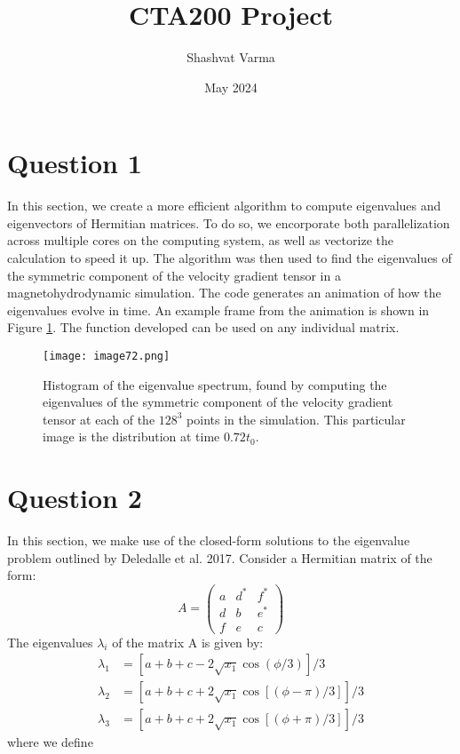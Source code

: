\documentclass{article}
\title{CTA200 Project}
\author{Shashvat Varma}
\date{May 2024}
\begin{document}
\maketitle

\section*{Question 1}
In this section, we create a more efficient algorithm to compute eigenvalues and eigenvectors of Hermitian matrices. To do so, we encorporate both parallelization across multiple cores on the computing system, as well as vectorize the calculation to speed it up. The algorithm was then used to find the eigenvalues of the symmetric component of the velocity gradient tensor in a magnetohydrodynamic simulation. The code generates an animation of how the eigenvalues evolve in time. An example frame from the animation is shown in Figure \ref{fig:eig_distr}. The function developed can be used on any individual matrix.
\begin{figure}[H]
    \centering
    \texttt{[image: image72.png]}
    \caption{Histogram of the eigenvalue spectrum, found by computing the eigenvalues of the symmetric component of the velocity gradient tensor at each of the $128^3$ points in the simulation. This particular image is the distribution at time $0.72 t_0$. }
    \label{fig:eig_distr}
\end{figure}

\section*{Question 2}
In this section, we make use of the closed-form solutions to the eigenvalue problem outlined by Deledalle et al. 2017. Consider a Hermitian matrix of the form:
\begin{equation}
    A = 
    \begin{pmatrix}
        a & d^* & f^* \\
        d & b& e^* \\
        f & e & c
    \end{pmatrix}
\end{equation}
The eigenvalues $\lambda_i$ of the matrix A is given by:
\begin{align}
    \lambda_1 &= \left[ a+b+c-2\sqrt{x_1} \cos(\phi/3)\right]/3 \\
    \lambda_2 &= \left[ a+b+c+2\sqrt{x_1} \cos[(\phi-\pi)/3]\right]/3 \\
    \lambda_3 &= \left[ a+b+c+2\sqrt{x_1} \cos[(\phi+\pi)/3]\right]/3
\end{align}
where we define
\end{document}
